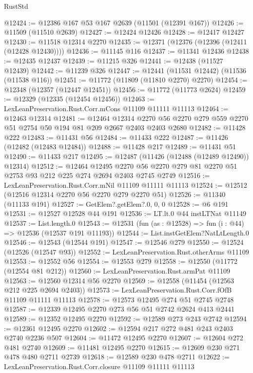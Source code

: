 \begin{lexlean}{RustStd}
\begin{coremodule}
@12424 := @12386 @167 @53 @167 @2639 (@11501 (@12391 @167))
@12426 := @11509 (@11510 @2639)
@12427 := @12424 @12426
@12428 := @12417 @12427
@12430 := @11518 @12314 @2270
@12435 := @12371 (@12376 (@12396 (@12411 (@12428 @12430))))
@12436 := @11145 @116
@12437 := @11341 @12436
@12438 := @12435 @12437
@12439 := @11215 @326
@12441 := @12438 (@11527 @12439)
@12442 := @11239 @326
@12447 := @12441 (@11531 @12442) (@11536 (@11538 @116))
@12451 := @11772 (@11809 (@11810 @2270) @2270)
@12454 := @12348 (@12357 (@12447 @12451))
@12456 := @11772 (@11773 @2624)
@12459 := @12329 (@12335 (@12454 @12456))
@12463 := LexLeanPreservation.Rust.Corr.mCons @11109 @11111 @11113
@12464 := @12463 @12314
@12481 := @12464
    @12314
    @2270
    @56
    @2270
    @279
    @559
    @2270
    @51
    @2754
    @50
    @194
    @81
    @209
    @2667
    @2403
    @2403
    @2680
@12482 := @11428 @222
@12483 := @11431 @56
@12484 := @11433 @222
@12487 := @11426 (@12482 (@12483 @12484))
@12488 := @11428 @217
@12489 := @11431 @51
@12490 := @11433 @217
@12495 := @12487 (@11426 (@12488 (@12489 @12490)) @12314)
@12512 := @12464
    @12495
    @2270
    @56
    @2270
    @279
    @81
    @2270
    @51
    @2753
    @93
    @212
    @225
    @274
    @2694
    @2403
    @2745
    @2749
@12516 := LexLeanPreservation.Rust.Corr.mNil @11109 @11111 @11113
@12524 := @12512 (@12516 @12314 @2270 @56 @2270 @279 @2270 @51)
@12526 := @11340 (@11133 @191)
@12527 := GetElem?.getElem?.{0, 0, 0}
@12528 := @6 @191
@12531 := @12527 @12528 @44 @191
@12536 := LT.lt.{0} @44 instLTNat @11149
@12537 := List.length.{0}
@12543 := @12531 (fun (as : @12528) => fun (i : @44) => @12536 (@12537 @191 @11193))
@12544 := List.instGetElem?NatLtLength.{0}
@12546 := @12543 (@12544 @191)
@12547 := @12546 @279
@12550 := @12524 (@12526 (@12547 @93))
@12552 := LexLeanPreservation.Rust.otherArms @11109
@12553 := @12552 @56
@12554 := @12553 @279
@12558 := @12550 (@11772 (@12554 @81 @212))
@12560 := LexLeanPreservation.Rust.armPat @11109
@12563 := @12560 @12314 @56 @2270
@12569 := @12558 (@11454 (@12563 @212 @225 @2694 @2403))
@12573 := LexLeanPreservation.Rust.Corr.fOfB @11109 @11111 @11113
@12578 := @12573 @12495 @274 @51 @2745 @2748
@12587 := @12339 @12495 @2270 @273 @56 @51 @2742 @2624 @413 @2441
@12589 := @12352 @12495 @2270
@12592 := @12589 @273 @243 @2742
@12594 := @12361 @12495 @2270
@12602 := @12594 @217 @272 @481 @243 @2403 @2740 @2236 @507
@12604 := @11472 @12495 @2270
@12607 := @12604 @272 @481 @2740
@12609 := @11481 @12495 @2270
@12615 := @12609 @230 @271 @478 @480 @2711 @2739
@12618 := @12589 @230 @478 @2711
@12622 := LexLeanPreservation.Rust.Corr.closure @11109 @11111 @11113

\end{coremodule}
\end{lexlean}

